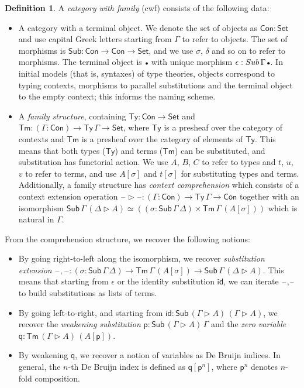 \documentclass[a4paper,UKenglish,cleveref, autoref, thm-restate]{lipics-v2021}
\theoremstyle{remark}
\theoremstyle{definition}
\newtheorem{mydefinition}{Definition}
\newcommand{\Seti}{\mathsf{Set}}
\newcommand{\Con}{\mathsf{Con}}
\newcommand{\Ty}{\mathsf{Ty}}
\newcommand{\Tm}{\mathsf{Tm}}
\newcommand{\Sub}{\mathsf{Sub}}
\newcommand{\emptycon}{\scaleobj{.75}\bullet}
\newcommand{\id}{\mathsf{id}}
\newcommand{\ext}{\triangleright}
\newcommand{\blank}{\mathord{\hspace{1pt}\text{--}\hspace{1pt}}}
\newcommand{\p}{\mathsf{p}}
\newcommand{\q}{\mathsf{q}}
\begin{document}
\begin{mydefinition}
A \emph{category with family} (cwf) \cite{Dybjer96internaltype} consists of the following data:
\begin{itemize}
\item A category with a terminal object. We denote the set of objects as $\Con :
  \Seti$ and use capital Greek letters starting from $\Gamma$ to refer to
  objects. The set of morphisms is $\Sub : \Con \to \Con \to \Seti$, and we use
  $\sigma$, $\delta$ and so on to refer to morphisms. The terminal object is
  $\emptycon$ with unique morphism $\epsilon : \Sub\,\Gamma\,\emptycon$. In
  initial models (that is, syntaxes) of type theories, objects correspond to
  typing contexts, morphisms to parallel substitutions and the terminal object to
  the empty context; this informs the naming scheme.
\item A \emph{family structure}, containing $\Ty : \Con \to \Seti$ and $\Tm :
  (\Gamma : \Con) \to \Ty\,\Gamma \to \Seti$, where $\Ty$ is a presheaf over the
  category of contexts and $\Tm$ is a presheaf over the category of elements of
  $\Ty$. This means that both types ($\Ty$) and terms ($\Tm$) can be
  substituted, and substitution has functorial action. We use $A$, $B$, $C$ to
  refer to types and $t$, $u$, $v$ to refer to terms, and use $A[\sigma]$ and
  $t[\sigma]$ for substituting types and terms. Additionally, a family structure
  has \emph{context comprehension} which consists of a context extension
  operation $\blank\ext\blank : (\Gamma : \Con) \to \Ty\,\Gamma \to \Con$
  together with an isomorphism $\Sub\,\Gamma\,(\Delta\ext A) \simeq ((\sigma :
  \Sub\,\Gamma\,\Delta) \times \Tm\,\Gamma\,(A[\sigma]))$ which is natural in
  $\Gamma$.
\end{itemize}
\end{mydefinition}

\noindent From the comprehension structure, we recover the following notions:

\begin{itemize}
\item By going right-to-left along the isomorphism, we recover \emph{substitution extension}
      $\blank,\blank : (\sigma : \Sub\,\Gamma\,\Delta) \to \Tm\,\Gamma\,(A[\sigma]) \to \Sub\,\Gamma\,(\Delta\ext A)$. This means
      that starting from $\epsilon$ or the identity substitution $\id$, we can iterate $\blank,\blank$
      to build substitutions as lists of terms.
\item By going left-to-right, and starting from $\id : \Sub\,(\Gamma\ext A)\,(\Gamma\ext A)$, we recover
      the \emph{weakening substitution} $\p : \Sub\,(\Gamma\ext A)\,\Gamma$ and the \emph{zero variable}
      $\q : \Tm\,(\Gamma\ext A)\,(A[\p])$.
\item By weakening $\q$, we recover a notion of variables as De Bruijn indices. In general, the $n$-th
      De Bruijn index is defined as $\q[\p^{n}]$, where $\p^{n}$ denotes $n$-fold composition.
\end{itemize}
\end{document}
